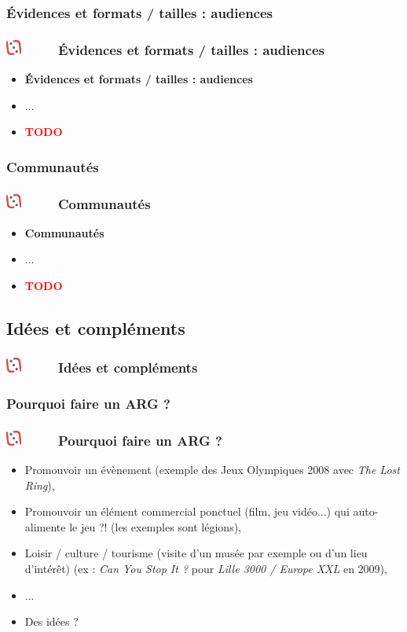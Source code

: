 \documentclass[slidetop,11pt]{beamer}
\def\moreInFrameTitleLeftt{\includegraphics[height=0.5cm]{img/ligueludique-0.png}~~~~~}
\begin{document}
\def\sectionPartIIbIV{{\'E}vidences et formats / tailles : audiences}
\subsubsection{\sectionPartIIbIV} %
\begin{frame}
	\frametitle{\moreInFrameTitleLeftt \sectionPartIIbIV }
	\begin{itemize}
		\item \textbf{ \sectionPartIIbIV }
		\item[] ...
		\item \textcolor{red}{ \textbf{TODO} }
	\end{itemize}
\end{frame} 

\def\sectionPartIIbV{Communaut{\'e}s}
\subsubsection{\sectionPartIIbV} %
\begin{frame}
	\frametitle{\moreInFrameTitleLeftt \sectionPartIIbV }
	\begin{itemize}
		\item \textbf{ \sectionPartIIbV }
		\item[] ...
		\item \textcolor{red}{ \textbf{TODO} }
	\end{itemize}
\end{frame} 


\def\sectionPartIIc{Id{\'e}es et compl{\'e}ments}
\subsection{\sectionPartIIc} %
\begin{frame}
	\frametitle{\moreInFrameTitleLeftt \sectionPartIIc }
	\tableofcontents[sections=2,currentsection,subsectionstyle=show/shaded/hide]
\end{frame} 

\def\sectionPartIIcI{Pourquoi faire un ARG ?}
\subsubsection{\sectionPartIIcI} %
\begin{frame}
	\frametitle{\moreInFrameTitleLeftt \sectionPartIIcI }
	\begin{itemize}
		\item Promouvoir un {\'e}v{\`e}nement (exemple des Jeux Olympiques 2008 avec \emph{The Lost Ring}), 
		\item Promouvoir un {\'e}l{\'e}ment commercial ponctuel (film, jeu vid{\'e}o...) qui auto-alimente le jeu ?! (les exemples sont l{\'e}gions), 
		\item Loisir / culture / tourisme (visite d'un mus{\'e}e par exemple ou d'un lieu d'int{\'e}r{\^e}t) (ex : \emph{Can You Stop It ?} pour \emph{Lille 3000 / Europe XXL} en 2009), 
		\item[] ...
		\item Des id{\'e}es ?
	\end{itemize}
\end{frame} 
\end{document}
